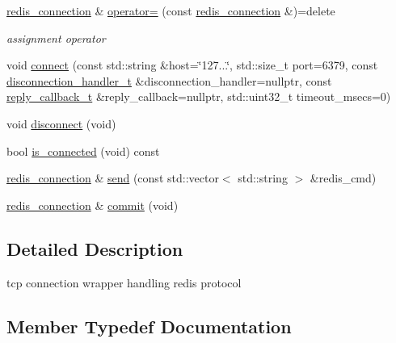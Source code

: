 \begin{DoxyCompactItemize}
\hyperlink{classcpp__redis_1_1network_1_1redis__connection}{redis\+\_\+connection} \& \hyperlink{classcpp__redis_1_1network_1_1redis__connection_a54a4c28ad1b9e9f3bac2854fddf4e30d}{operator=} (const \hyperlink{classcpp__redis_1_1network_1_1redis__connection}{redis\+\_\+connection} \&)=delete
\begin{DoxyCompactList}\small\item\em assignment operator \end{DoxyCompactList}\item 
void \hyperlink{classcpp__redis_1_1network_1_1redis__connection_af105573e46eadbc34a9f5907832df19f}{connect} (const std\+::string \&host=\char`\"{}127...\char`\"{}, std\+::size\+\_\+t port=6379, const \hyperlink{classcpp__redis_1_1network_1_1redis__connection_aba1a229a3d36a5540a80776ed0cf9a44}{disconnection\+\_\+handler\+\_\+t} \&disconnection\+\_\+handler=nullptr, const \hyperlink{classcpp__redis_1_1network_1_1redis__connection_a40f4b55a3103b7436e34211893377245}{reply\+\_\+callback\+\_\+t} \&reply\+\_\+callback=nullptr, std\+::uint32\+\_\+t timeout\+\_\+msecs=0)
\item 
void \hyperlink{classcpp__redis_1_1network_1_1redis__connection_abdeb36976c0a0e5cc16d7ba4259e7e49}{disconnect} (void)
\item 
bool \hyperlink{classcpp__redis_1_1network_1_1redis__connection_ad3d96826e2e67fb3fed23280237d4d9c}{is\+\_\+connected} (void) const
\item 
\hyperlink{classcpp__redis_1_1network_1_1redis__connection}{redis\+\_\+connection} \& \hyperlink{classcpp__redis_1_1network_1_1redis__connection_a98c163ce431e85e46e139211564b7b3f}{send} (const std\+::vector$<$ std\+::string $>$ \&redis\+\_\+cmd)
\item 
\hyperlink{classcpp__redis_1_1network_1_1redis__connection}{redis\+\_\+connection} \& \hyperlink{classcpp__redis_1_1network_1_1redis__connection_a8e6980d40139877c16e995051b780d60}{commit} (void)
\end{DoxyCompactItemize}


\subsection{Detailed Description}
tcp connection wrapper handling redis protocol 

\subsection{Member Typedef Documentation}
\mbox{\label{classcpp__redis_1_1network_1_1redis__connection_aba1a229a3d36a5540a80776ed0cf9a44}} 

